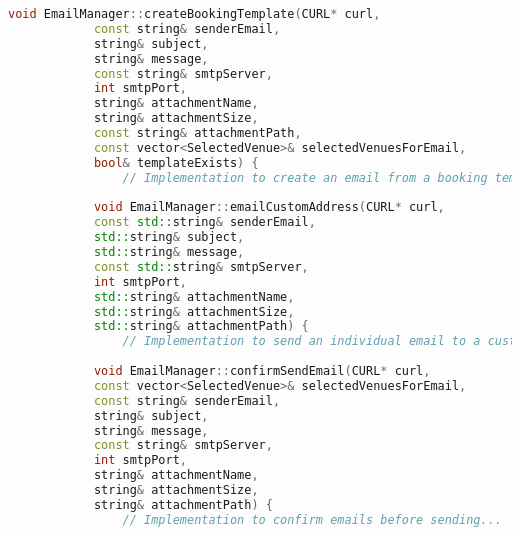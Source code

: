 \documentclass{article}
\begin{document}
\begin{mdframed}[backgroundcolor=background, hidealllines=false, innerleftmargin=15pt, innerrightmargin=5pt, innertopmargin=0pt, innerbottommargin=-5pt]
\begin{lstlisting}[language=C++]
			void EmailManager::createBookingTemplate(CURL* curl,
			const string& senderEmail,
			string& subject,
			string& message,
			const string& smtpServer,
			int smtpPort,
			string& attachmentName,
			string& attachmentSize,
			const string& attachmentPath,
			const vector<SelectedVenue>& selectedVenuesForEmail,
			bool& templateExists) {
				// Implementation to create an email from a booking template...
				
			void EmailManager::emailCustomAddress(CURL* curl,
			const std::string& senderEmail,
			std::string& subject,
			std::string& message,
			const std::string& smtpServer,
			int smtpPort,
			std::string& attachmentName,
			std::string& attachmentSize,
			std::string& attachmentPath) {
				// Implementation to send an individual email to a custom address...
				
			void EmailManager::confirmSendEmail(CURL* curl,
			const vector<SelectedVenue>& selectedVenuesForEmail,
			const string& senderEmail,
			string& subject,
			string& message,
			const string& smtpServer,
			int smtpPort,
			string& attachmentName,
			string& attachmentSize,
			string& attachmentPath) {
				// Implementation to confirm emails before sending...
															
		\end{lstlisting}
	\end{mdframed}
	
\end{document}
